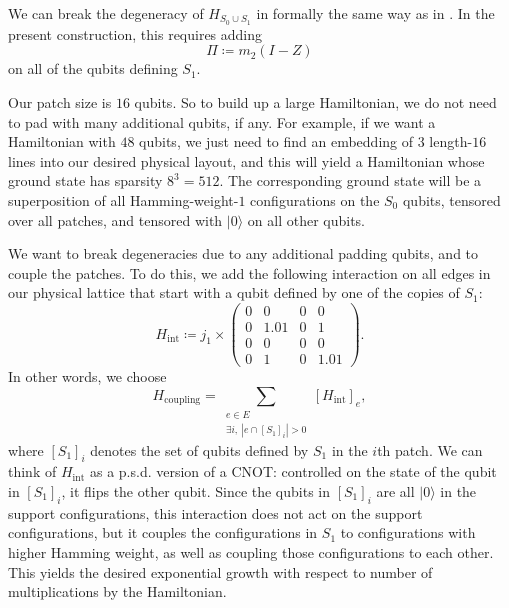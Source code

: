 \documentclass[
  reprint,            %
  amsmath,amssymb,
  aps,
  superscriptaddress, %
  longbibliography
]{revtex4-2}
\theoremstyle{definition}
\begin{document}
 We can break the degeneracy of $H_{S_0\cup S_1}$ in formally the same way as in .
In the present construction, this requires adding
\begin{equation}
\label{m2_def}
    \Pi\coloneqq m_2(I-Z)
\end{equation}
on all of the qubits defining $S_1$.

Our patch size is $16$ qubits.
So to build up a large Hamiltonian, we do not need to pad with many additional qubits, if any.
For example, if we want a Hamiltonian with $48$ qubits, we just need to find an embedding of $3$ length-$16$ lines into our desired physical layout, and this will yield a Hamiltonian whose ground state has sparsity $8^3=512$.
The corresponding ground state will be a superposition of all Hamming-weight-$1$ configurations on the $S_0$ qubits, tensored over all patches, and tensored with $|0\rangle$ on all other qubits.

We want to break degeneracies due to any additional padding qubits, and to couple the patches.
To do this, we add the following interaction on all edges in our physical lattice that start with a qubit defined by one of the copies of $S_1$:
\begin{equation}
\label{j1_def}
    H_\mathrm{int}
    \coloneqq
    j_1\times\begin{pmatrix}
        0 & 0 & 0 & 0 \\
        0 & 1.01 & 0 & 1 \\
        0 & 0 & 0 & 0 \\
        0 & 1 & 0 & 1.01
    \end{pmatrix}.
\end{equation}
In other words, we choose
\begin{equation}
    H_\mathrm{coupling} = \sum_{\substack{e\in E\\\exists i,~|e\cap [S_1]_i|>0}}[H_\mathrm{int}]_e,
\end{equation}
where $[S_1]_i$ denotes the set of qubits defined by $S_1$ in the $i$th patch.
We can think of $H_\mathrm{int}$ as a p.s.d. version of a CNOT: controlled on the state of the qubit in $[S_1]_i$, it flips the other qubit.
Since the qubits in $[S_1]_i$ are all $|0\rangle$ in the support configurations, this interaction does not act on the support configurations, but it couples the configurations in $S_1$ to configurations with higher Hamming weight, as well as coupling those configurations to each other.
This yields the desired exponential growth with respect to number of multiplications by the Hamiltonian.
\end{document}
